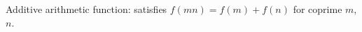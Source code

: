 \begin{definition}[IsAdditive]
\label{IsAdditive}
\leanok
Additive arithmetic function: satisfies $f(mn) = f(m) + f(n)$ for coprime $m$, $n$.
\end{definition}
